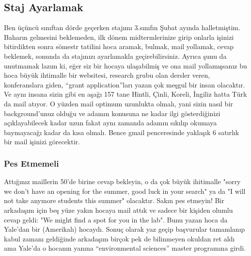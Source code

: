 \documentclass[12pt,a4paper]{article}
\begin{document}
\subsection{Staj Ayarlamak}
Ben üçüncü sınıftan dörde geçerken stajımı 3.sınıfın Şubat ayında halletmiştim. Baharın gelmesini beklemeden, ilk dönem midtermlerinize girip onlarla işinizi bitirdikten sonra sömestr tatilini hoca aramak, bulmak, mail yollamak, cevap beklemek, sonunda da stajınızı ayarlamakla geçirebilirsiniz. Ayrıca şunu da unutmamak lazım ki, eğer siz bir hocaya ulaşabilmiş ve ona mail yollamışsanız bu hoca büyük ihtimalle bir websitesi, research grubu olan dersler veren, konferanslara giden, “grant application”ları yazan çok meşgul bir insan olacaktır. Ve aynı insana sizin gibi en aşağı 157 tane Hintli, Çinli, Koreli, İngiliz hatta Türk da mail atıyor. O yüzden mail optimum uzunlukta olmalı, yani sizin nasıl bir background’unuz olduğu ve adamın konusuna ne kadar ilgi gösterdiğinizi açıklayabilecek kadar uzun fakat aynı zamanda adamın sıkılıp okumaya baymayacağı kadar da kısa olmalı. Bence gmail penceresinde yaklaşık 6 satırlık bir mail işinizi görecektir.

\subsubsection{Pes Etmemeli}
Attığınız maillerin 50'de birine cevap bekleyin, o da çok büyük ihitimalle "sorry we don't have an opening for the summer, good luck in your search" ya da "I will not take anymore students  this summer" olacaktır. Sakın pes etmeyin! Bir arkadaşım için beş yüze yakın hocaya mail attık ve sadece bir kişiden olumlu cevap geldi: "We might find a spot for you in the lab". Bunu yazan hoca da Yale'dan bir (Amerikalı) hocaydı. Sonuç olarak yaz geçip başvurular tamamlanıp kabul zamanı geldiğinde arkadaşım birçok pek de bilinmeyen okuldan ret aldı ama Yale'da o hocanın yanına “environmental sciences” master programına girdi.
\end{document}
